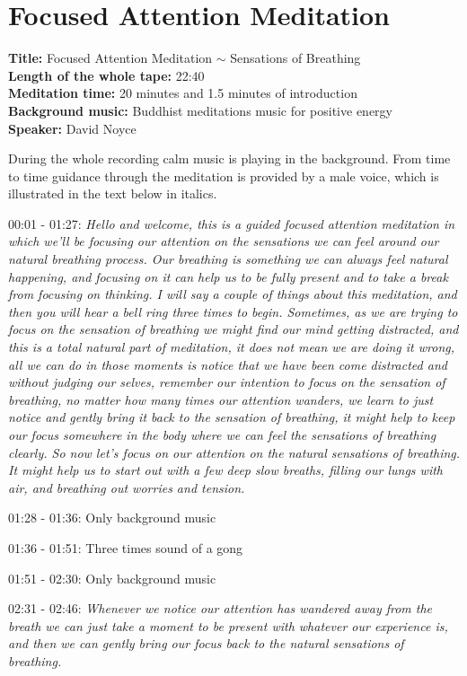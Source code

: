 \chapter{Focused Attention Meditation} \label{FAM}
\textbf{Title:} Focused Attention Meditation $\sim$  Sensations of Breathing  \\
\textbf{Length of the whole tape:} 22:40 \\
\textbf{Meditation time:} 20 minutes and 1.5 minutes of introduction \\
\textbf{Background music:} Buddhist meditations music for positive energy  \\
\textbf{Speaker:} David Noyce 

During the whole recording calm music is playing in the background. From time to time guidance through the meditation is provided by a male voice, which is illustrated in the text below in italics. 

00:01 - 01:27: \textit{Hello and welcome, this is a guided focused attention meditation in which we'll be focusing our attention on the sensations we can feel around our natural breathing process. Our breathing is something we can always feel natural happening, and focusing on it can help us to be fully present and to take a break from focusing on thinking. I will say a couple of things about this meditation, and then you will hear a bell ring three times to begin. Sometimes, as we are trying to focus on the sensation of breathing we might find our mind getting distracted, and this is a total natural part of meditation, it does not mean we are doing it wrong, all we can do in those moments is notice that we have been come distracted and without judging our selves, remember our intention to focus on the sensation of breathing, no matter how many times our attention wanders, we learn to just notice and gently bring it back to the sensation of breathing, it might help to keep our focus somewhere in the body where we can feel the sensations of breathing clearly. So now let's focus on our attention on the natural sensations of breathing. It might help us to start out with a few deep slow breaths, filling our lungs with air, and breathing out worries and tension.}

01:28 - 01:36: Only background music 

01:36 - 01:51: Three times sound of a gong 

01:51 - 02:30: Only background music

02:31 - 02:46: \textit{Whenever we notice our attention has wandered away from the breath we can just take a moment to be present with whatever our experience is, and then we can gently bring our focus back to the natural sensations of breathing. }

